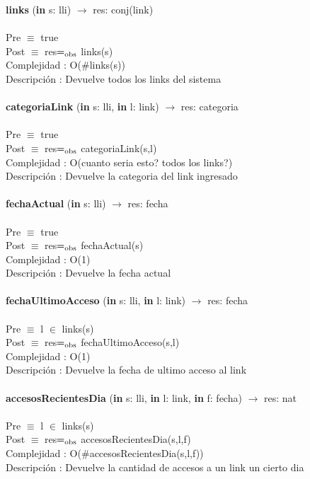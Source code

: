 \documentclass[10pt, a4paper]{article}
\begin{document}
	\textbf{links} (\textbf{in} s: lli) $\longrightarrow$ res: conj(link)\\\\
	Pre $\equiv$ {true}\\
	Post $\equiv$ {res$=_{\mathrm{obs}}$ links(s)}\\
	Complejidad : O($\#$links(s))\\
	Descripci\'{o}n : Devuelve todos los links del sistema\\\\
	
	\textbf{categoriaLink} (\textbf{in} s: lli, \textbf{in} l: link) $\longrightarrow$ res: categoria\\\\
	Pre $\equiv$ {true}\\
	Post $\equiv$ {res$=_{\mathrm{obs}}$ categoriaLink(s,l)}\\
	Complejidad : O(cuanto seria esto? todos los links?)\\
	Descripci\'{o}n : Devuelve la categoria del link ingresado\\\\

	\textbf{fechaActual} (\textbf{in} s: lli) $\longrightarrow$ res: fecha\\\\
	Pre $\equiv$ {true}\\
	Post $\equiv$ {res$=_{\mathrm{obs}}$ fechaActual(s)}\\
	Complejidad : O(1)\\
	Descripci\'{o}n : Devuelve la fecha actual\\\\
	
	\textbf{fechaUltimoAcceso} (\textbf{in} s: lli, \textbf{in} l: link) $\longrightarrow$ res: fecha\\\\
	Pre $\equiv$ {l $\in$ links(s)}\\
	Post $\equiv$ {res$=_{\mathrm{obs}}$ fechaUltimoAcceso(s,l)}\\
	Complejidad : O(1)\\
	Descripci\'{o}n : Devuelve la fecha de ultimo acceso al link\\\\
	
	\textbf{accesosRecientesDia} (\textbf{in} s: lli, \textbf{in} l: link, \textbf{in} f: fecha) $\longrightarrow$ res: nat\\\\
	Pre $\equiv$ {l $\in$ links(s)}\\
	Post $\equiv$ {res$=_{\mathrm{obs}}$ accesosRecientesDia(s,l,f)}\\
	Complejidad : O($\#$accesosRecientesDia(s,l,f))\\
	Descripci\'{o}n : Devuelve la cantidad de accesos a un link un cierto dia\\\\
	
\end{document}
